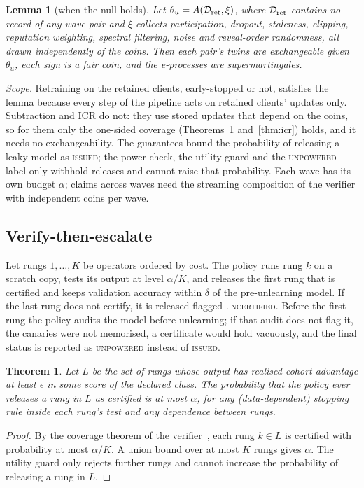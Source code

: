 \documentclass[journal]{IEEEtran}
\newtheorem{theorem}{Theorem}
\newtheorem{lemma}{Lemma}
\begin{document}
\begin{lemma}[when the null holds]\label{lem:null}
Let $\theta_u=A(\mathcal D_{\rm ret},\xi)$, where $\mathcal D_{\rm ret}$ contains no record of any wave pair and $\xi$ collects participation, dropout, staleness, clipping, reputation weighting, spectral filtering, noise and reveal-order randomness, all drawn independently of the coins. Then each pair's twins are exchangeable given $\theta_u$, each sign is a fair coin, and the e-processes are supermartingales.
\end{lemma}
\emph{Scope.} Retraining on the retained clients, early-stopped or not, satisfies the lemma because every step of the pipeline acts on retained clients' updates only. Subtraction and ICR do not: they use stored updates that depend on the coins, so for them only the one-sided coverage (Theorems~\ref{thm:esc} and~\ref{thm:icr}) holds, and it needs no exchangeability. The guarantees bound the probability of releasing a leaky model as \textsc{issued}; the power check, the utility guard and the \textsc{unpowered} label only withhold releases and cannot raise that probability. Each wave has its own budget $\alpha$; claims across waves need the streaming composition of the verifier with independent coins per wave.

\subsection{Verify-then-escalate}
Let rungs $1,\dots,K$ be operators ordered by cost. The policy runs rung $k$ on a scratch copy, tests its output at level $\alpha/K$, and releases the first rung that is certified and keeps validation accuracy within $\delta$ of the pre-unlearning model. If the last rung does not certify, it is released flagged \textsc{uncertified}. Before the first rung the policy audits the model before unlearning; if that audit does not flag it, the canaries were not memorised, a certificate would hold vacuously, and the final status is reported as \textsc{unpowered} instead of \textsc{issued}.

\begin{theorem}\label{thm:esc}
Let $L$ be the set of rungs whose output has realised cohort advantage at least $\epsilon$ in some score of the declared class. The probability that the policy ever releases a rung in $L$ as certified is at most $\alpha$, for any (data-dependent) stopping rule inside each rung's test and any dependence between rungs.
\end{theorem}
\begin{proof}
By the coverage theorem of the verifier~\cite{dang2026vouch}, each rung $k\in L$ is certified with probability at most $\alpha/K$. A union bound over at most $K$ rungs gives $\alpha$. The utility guard only rejects further rungs and cannot increase the probability of releasing a rung in $L$.
\end{proof}
\end{document}
